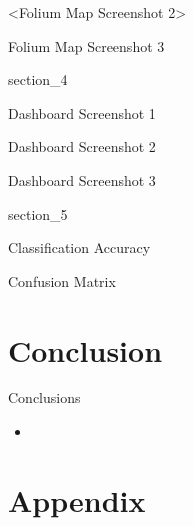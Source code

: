 \begin{frame}{<Folium Map Screenshot 2>}

\end{frame}

\begin{frame}{Folium Map Screenshot 3}

\end{frame}

{
{section_4}
\begin{frame}[plain]
\end{frame}
}

\begin{frame}{Dashboard Screenshot 1}

\end{frame}

\begin{frame}{Dashboard Screenshot 2}

\end{frame}

\begin{frame}{Dashboard Screenshot 3}

\end{frame}

{
{section_5}
\begin{frame}[plain]
\end{frame}
}

\begin{frame}{Classification Accuracy}

\end{frame}

\begin{frame}{Confusion Matrix}

\end{frame}

\section{Conclusion}

\begin{frame}{Conclusions}
    \begin{itemize}
        \item
    \end{itemize}
\end{frame}

\section{Appendix}

